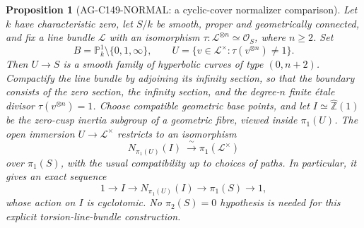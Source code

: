 \documentclass[11pt,a4paper]{article}
\newtheorem{proposition}{Proposition}
\begin{document}
\begin{proposition}[AG-C149-NORMAL: a cyclic-cover normalizer comparison]
Let $k$ have characteristic zero, let $S/k$ be smooth, proper and
geometrically connected, and fix a line bundle $\mathcal L$ with
an isomorphism $\tau:\mathcal L^{\otimes n}\simeq\mathcal O_S$,
where $n\ge2$. Set
\[
 B=\mathbb P^1_k\setminus\{0,1,\infty\},\qquad
 U=\{v\in\mathcal L^\times:\tau(v^{\otimes n})\ne1\}.
\]
Then $U\to S$ is a smooth family of hyperbolic curves of type
$(0,n+2)$. Compactify the line bundle by adjoining its infinity
section, so that the boundary consists of the zero section, the
infinity section, and the degree-$n$ finite \'etale divisor
$\tau(v^{\otimes n})=1$. Choose compatible geometric base points,
and let $I\simeq\widehat{\mathbb Z}(1)$ be the zero-cusp inertia
subgroup of a geometric fibre, viewed inside $\pi_1(U)$.
The open immersion $U\to\mathcal L^\times$ restricts to an
isomorphism
\begin{equation}\label{eq:ag-cusp-normalizer}
 N_{\pi_1(U)}(I)\ \xrightarrow{\ \sim\ }
 \pi_1(\mathcal L^\times)
\end{equation}
over $\pi_1(S)$, with the usual compatibility up to choices of
paths. In particular, it gives an exact sequence
\[
 1\longrightarrow I\longrightarrow N_{\pi_1(U)}(I)
 \longrightarrow\pi_1(S)\longrightarrow1,
\]
whose action on $I$ is cyclotomic. No $\pi_2(S)=0$ hypothesis is
needed for this explicit torsion-line-bundle construction.
\end{proposition}
\end{document}
